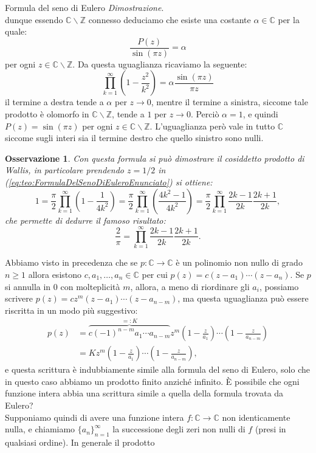 \documentclass[11pt]{book}
\makeatletter
\theoremstyle{Definizione}
\theoremstyle{TeoremaProposizioneLemmaCorollarioCongettura}
\theoremstyle{OsservazioneNotaEsempio}
\newtheorem{myobs}{Osservazione}[section]
\renewenvironment{proof}[1][\proofname]{\par
  \normalfont \topsep6\p@\@plus6\p@\relax
  \trivlist
  \item[\hskip\labelsep
        \itshape
    #1\@addpunct{.}]\ignorespaces
}{%
  \endtrivlist\@endpefalse
}
\renewenvironment{proof}{\textsl{Dimostrazione}.}{}
\newcommand{\Z}{\mathbb{Z}}
\newcommand{\C}{\mathbb{C}}
\newcommand{\tolto}{\smallsetminus}
\makeatother
\begin{document}
\begin{boxteo}{Formula del seno di Eulero}
\begin{proof}
$$$$
dunque essendo $\C\tolto \Z$ connesso deduciamo che esiste una costante $\alpha\in \C$ per la quale:
$$
\frac{P(z)}{\sin(\pi z)} = \alpha
$$
per ogni $z\in \C\tolto \Z$. Da questa uguaglianza ricaviamo la seguente:
$$
\prod_{k = 1}^\infty \left(1-\frac{z^2}{k^2}\right) = \alpha \frac{\sin(\pi z)}{\pi z}
$$
il termine a destra tende a $\alpha$ per $z \to 0$, mentre il termine a sinistra, siccome tale prodotto è olomorfo in  $\C\tolto \Z$, tende a $1$ per $z \to 0$. Perciò $\alpha = 1$, e quindi $P(z) = \sin(\pi z)$ per ogni $z\in \C \tolto \Z$. L'uguaglianza però vale in tutto $\C$ siccome sugli interi sia il termine destro che quello sinistro sono nulli.
\end{proof}
\end{boxteo}
\begin{myobs}
Con questa formula si può dimostrare il cosiddetto prodotto di Wallis, in particolare prendendo $z = 1/2$ in (\ref{eq:teo:FormulaDelSenoDiEuleroEnunciato}) si ottiene:
$$
1 = \frac{\pi}{2}\prod_{k = 1}^\infty \left(1-\frac{1}{4k^2}\right) = \frac{\pi}{2}\prod_{k = 1}^\infty \left(\frac{4k^2-1}{4k^2}\right) = \frac{\pi}{2} \prod_{k = 1}^\infty \frac{2k-1}{2k}\frac{2k+1}{2k},
$$
che permette di dedurre il famoso risultato:
$$
\frac{2}{\pi} = \prod_{k = 1}^\infty \frac{2k-1}{2k}\frac{2k+1}{2k}.
$$
\end{myobs}
Abbiamo visto in precedenza che se $p:\C\longrightarrow \C$ è un polinomio non nullo di grado $n\geq 1$ allora esistono $c,a_1,\dots,a_n\in \C$ per cui $p(z) = c (z-a_1)\cdots(z-a_n)$. Se $p$ si annulla in $0$ con molteplicità $m$, allora, a meno di riordinare gli $a_i$, possiamo scrivere $p(z) = cz^m (z-a_1)\cdots (z-a_{n-m})$, ma questa uguaglianza può essere riscritta in un modo più suggestivo:
\begin{align*}
p(z) &= \overbrace{c (-1)^{n-m} a_1\cdots a_{n-m}}^{=:K} z^m\left(1-\frac{z}{a_1}\right)\cdots \left(1-\frac{z}{a_{n-m}}\right)\\
&= K z^m \left(1-\frac{z}{a_1}\right)\cdots \left(1-\frac{z}{a_{n-m}}\right),
\end{align*}
e questa scrittura è indubbiamente simile alla formula del seno di Eulero, solo che in questo caso abbiamo un prodotto finito anziché infinito. È possibile che ogni funzione intera abbia una scrittura simile a quella della formula trovata da Eulero?\\
Supponiamo quindi di avere una funzione intera $f:\C\longrightarrow \C$ non identicamente nulla, e chiamiamo $\{a_n\}_{n = 1}^\infty$ la successione degli zeri non nulli di $f$ (presi in qualsiasi ordine). In generale il prodotto
\end{document}
